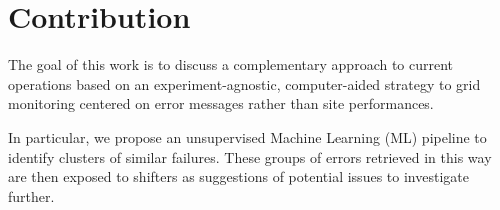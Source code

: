 \section{Contribution}
The goal of this work is to discuss a complementary approach to current operations based on an experiment-agnostic, computer-aided strategy to grid monitoring centered on error messages rather than site performances.

In particular, we propose an unsupervised Machine Learning (ML) pipeline to identify clusters of similar failures. These groups of errors retrieved in this way are then exposed to shifters as suggestions of potential issues to investigate further.

